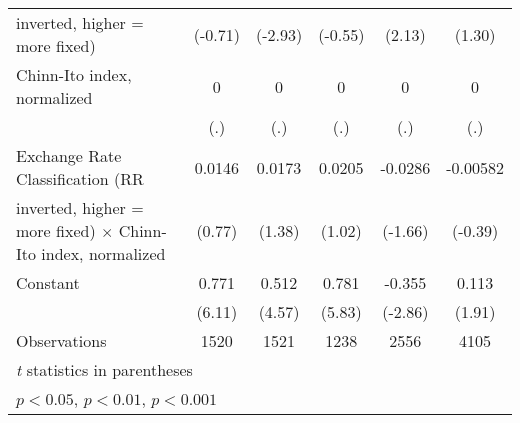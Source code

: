 {\begin{tabular}{l*{5}{c}}
inverted, higher = more fixed)          &  (-0.71)         &  (-2.93)         &  (-0.55)         &   (2.13)         &   (1.30)         \\
\addlinespace
Chinn-Ito index, normalized             &        0         &        0         &        0         &        0         &        0         \\
                                        &      (.)         &      (.)         &      (.)         &      (.)         &      (.)         \\
\addlinespace
Exchange Rate Classification (RR        &   0.0146         &   0.0173         &   0.0205         &  -0.0286         & -0.00582         \\
inverted, higher = more fixed) $\times$ Chinn-Ito index, normalized&   (0.77)         &   (1.38)         &   (1.02)         &  (-1.66)         &  (-0.39)         \\
\addlinespace
Constant                                &    0.771\sym{***}&    0.512\sym{***}&    0.781\sym{***}&   -0.355\sym{**} &    0.113         \\
                                        &   (6.11)         &   (4.57)         &   (5.83)         &  (-2.86)         &   (1.91)         \\
\midrule
Observations                            &     1520         &     1521         &     1238         &     2556         &     4105         \\
\bottomrule
\multicolumn{6}{l}{\footnotesize \textit{t} statistics in parentheses}\\
\multicolumn{6}{l}{\footnotesize \sym{*} \(p<0.05\), \sym{**} \(p<0.01\), \sym{***} \(p<0.001\)}\\
\end{tabular}
}
